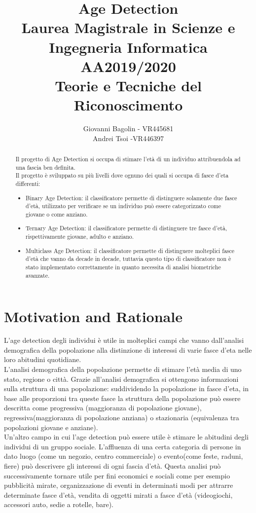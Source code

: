 \documentclass[12pt]{IEEEtran}
\title{
Age Detection \\

\large Laurea Magistrale in Scienze e Ingegneria Informatica AA2019/2020\\
\large Teorie e Tecniche del Riconoscimento}
\author{Giovanni Bagolin - VR445681\\Andrei Tsoi -VR446397}
\begin{document}
\maketitle

\begin {abstract}
Il progetto di Age Detection si occupa di stimare l'età di un individuo attribuendola ad una fascia ben definita.\\
Il progetto è sviluppato su più livelli dove ognuno dei quali si occupa di fasce d'eta differenti:
\begin{itemize}
\item  Binary Age Detection: il classificatore permette di distinguere solamente due fasce d'età, utilizzato per verificare se un individuo può essere categorizzato come giovane o come anziano.
\item Ternary Age Detection: il classificatore permette di distinguere tre fasce d'età, rispettivamente giovane, adulto e anziano.
\item Multiclass Age Detection: il classificatore permette di distinguere molteplici fasce d'età che vanno da decade in decade, tuttavia questo tipo di classificatore non è stato implementato correttamente in quanto necessita di analisi biometriche avanzate.
\end{itemize}
\end{abstract}

\section{Motivation  and Rationale}
L'age detection degli individui è utile in molteplici campi che vanno dall'analisi demografica della popolazione alla distinzione di interessi di varie fasce d'eta nelle loro abitudini quotidiane.\\
L'analisi demografica della popolazione permette di stimare l'età media di uno stato, regione o città. Grazie all'analisi demografica si ottengono informazioni sulla struttura di una popolazione: suddividendo la popolazione in fasce d'eta, in base alle proporzioni tra queste fasce la struttura della popolazione può essere descritta come progressiva (maggioranza di popolazione giovane),  regressiva(maggioranza di popolazione anziana) o stazionaria (equivalenza tra popolazioni giovane e anziane).\\
Un'altro campo in cui  l'age detection può essere utile è stimare le abitudini degli individui di un gruppo sociale. L'affluenza di una certa categoria di persone in dato luogo (come un negozio, centro commerciale) o evento(come feste, raduni, fiere) può descrivere gli interessi di ogni fascia d'età. Questa analisi può successivamente tornare utile per fini economici e sociali come per esempio pubblicità mirate, organizzazione di eventi in determinati modi per attrarre determinate fasce d'età, vendita di oggetti mirati a fasce d'età (videogiochi, accessori auto, sedie a rotelle, bare).  
\end{document}
